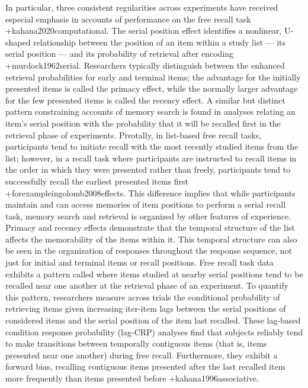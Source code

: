 {}In particular, three consistent regularities across experiments have received especial emphasis in accounts of performance on the free recall task +{}{}{kahana2020computational}. The serial position effect identifies a nonlinear, U-shaped relationship between the position of an item within a study list --- its serial position --- and its probability of retrieval after encoding +{}{}{murdock1962serial}. Researchers typically distinguish between the enhanced retrieval probabilities for early and terminal items; the advantage for the initially presented items is called the primacy effect, while the normally larger advantage for the few presented items is called the recency effect.\markdownRendererInterblockSeparator
{}A similar but distinct pattern constraining accounts of memory search is found in analyses relating an item's serial position with the probability that it will be recalled first in the retrieval phase of experiments. Pivotally, in list-based free recall tasks, participants tend to initiate recall with the most recently studied items from the list; however, in a  recall task where participants are instructed to recall items in the order in which they were presented rather than freely, participants tend to successfully recall the earliest presented items first +{for\markdownRendererNbsp{}example\markdownRendererNbsp{}in}{}{golomb2008effects}. This difference implies that while participants maintain and can access memories of item positions to perform a serial recall task, memory search and retrieval is organized by other features of experience.\markdownRendererInterblockSeparator
{}Primacy and recency effects demonstrate that the temporal structure of the list affects the memorability of the items within it. This temporal structure can also be seen in the organization of responses throughout the response sequence, not just for initial and terminal items or recall positions. Free recall task data exhibits a pattern called  where items studied at nearby serial positions tend to be recalled near one another at the retrieval phase of an experiment. To quantify this pattern, researchers measure across trials the conditional probability of retrieving items given increasing iter-item lags between the serial positions of considered items and the serial position of the item last recalled. These lag-based condition response probability (lag-CRP) analyses find that subjects reliably tend to make transitions between temporally contiguous items (that is, items presented near one another) during free recall. Furthermore, they exhibit a forward bias, recalling contiguous items presented after the last recalled item more frequently than items presented before +{}{}{kahana1996associative}.\markdownRendererInterblockSeparator
